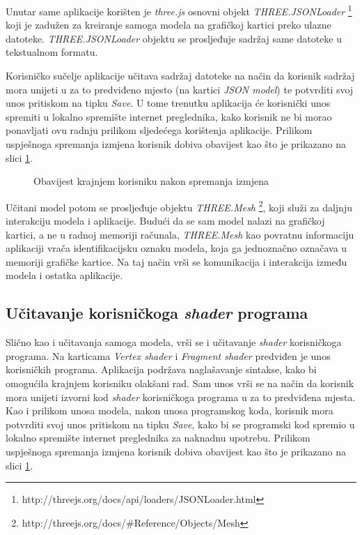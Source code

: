 Unutar same aplikacije korišten je \emph{three.js} osnovni objekt \emph{THREE.JSONLoader} \footnote{http://threejs.org/docs/api/loaders/JSONLoader.html} koji je zadužen za kreiranje samoga modela na grafičkoj kartici preko ulazne datoteke. \emph{THREE.JSONLoader} objektu se prosljeđuje sadržaj same datoteke u tekstualnom formatu.

Korisničko sučelje aplikacije učitava sadržaj datoteke na način da korisnik sadržaj mora unijeti u za to predviđeno mjesto (na kartici \emph{JSON model}) te potvrditi svoj unos pritiskom na tipku \emph{Save}. U tome trenutku aplikacija će korisnički unos spremiti u lokalno spremište internet preglednika, kako korisnik ne bi morao ponavljati ovu radnju prilikom sljedećega korištenja aplikacije. Prilikom uspješnoga spremanja izmjena korisnik dobiva obavijest kao što je prikazano na slici \ref{fig:interface-save}.

\begin{figure}[H]
\centering{}
\caption{Obavijest krajnjem korisniku nakon spremanja izmjena}
\label{fig:interface-save}
\end{figure}

Učitani model potom se prosljeđuje objektu \emph{THREE.Mesh} \footnote{http://threejs.org/docs/\#Reference/Objects/Mesh}, koji služi za daljnju interakciju modela i aplikacije. Budući da se sam model nalazi na grafičkoj kartici, a ne u radnoj memoriji računala, \emph{THREE.Mesh} kao povratnu informaciju aplikaciji vrača identifikacijsku oznaku modela, koja ga jednoznačno označava u memoriji grafičke kartice. Na taj način vrši se komunikacija i interakcija između modela i ostatka aplikacije.

\subsection{Učitavanje korisničkoga \emph{shader} programa}

Slično kao i učitavanja samoga modela, vrši se i učitavanje \emph{shader} korisničkoga programa. Na karticama \emph{Vertex shader} i \emph{Fragment shader} predviđen je unos korisničkih programa. Aplikacija podržava naglašavanje sintakse, kako bi omogućila krajnjem korisniku olakšani rad. Sam unos vrši se na način da korisnik mora unijeti izvorni kod \emph{shader} korisničkoga programa u za to predviđena mjesta. Kao i prilikom unosa modela, nakon unosa programskog koda, korisnik mora potvrditi svoj unos pritiskom na tipku \emph{Save}, kako bi se programski kod spremio u lokalno spremište internet preglednika za naknadnu upotrebu. Prilikom uspješnoga spremanja izmjena korisnik dobiva obavijest kao što je prikazano na slici \ref{fig:interface-save}.

